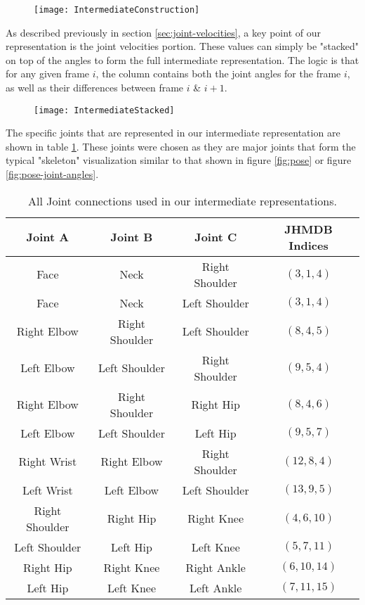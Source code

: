 \begin{figure}[ht]
	\texttt{[image: IntermediateConstruction]}
	\centering
	\caption{}
	\label{fig:intermediate-construction}
\end{figure}

As described previously in section \ref{sec:joint-velocities}, a key point of our representation is the joint velocities portion. These values can simply be "stacked" on top of the angles to form the full intermediate representation. The logic is that for any given frame $i$, the column contains both the joint angles for the frame $i$, as well as their differences between frame $i$ \& $i+1$.

\begin{figure}[ht]
	\texttt{[image: IntermediateStacked]}
	\centering
	\caption{}
	\label{fig:intermediate-stacked}
\end{figure}

The specific joints that are represented in our intermediate representation are shown in table \ref{tab:joint-connections}. These joints were chosen as they are major joints that form the typical "skeleton" visualization similar to that shown in figure \ref{fig:pose} or figure \ref{fig:pose-joint-angles}.

\begin{table}[ht]
	\centering
	\begin{tabular}{||c c c c||} 
		\hline
		\textbf{Joint A} & \textbf{Joint B} & \textbf{Joint C} & \textbf{JHMDB Indices} \\ [0.5ex] 
		\hline\hline
		Face & Neck & Right Shoulder & $(3, 1, 4)$ \\
		Face & Neck & Left Shoulder & $(3, 1, 4)$ \\
		\hline
		Right Elbow & Right Shoulder & Left Shoulder & $(8, 4, 5)$ \\
		Left Elbow & Left Shoulder & Right Shoulder & $(9, 5, 4)$ \\
		\hline
		Right Elbow & Right Shoulder & Right Hip & $(8, 4, 6)$ \\
		Left Elbow & Left Shoulder & Left Hip & $(9, 5, 7)$ \\
		\hline
		Right Wrist & Right Elbow & Right Shoulder & $(12, 8, 4)$ \\
		Left Wrist & Left Elbow & Left Shoulder & $(13, 9, 5)$ \\
		\hline
		Right Shoulder & Right Hip & Right Knee & $(4, 6, 10)$ \\
		Left Shoulder & Left Hip & Left Knee & $(5, 7, 11)$ \\
		\hline
		Right Hip & Right Knee & Right Ankle & $(6, 10, 14)$ \\
		Left Hip & Left Knee & Left Ankle & $(7, 11, 15)$ \\
		\hline
	\end{tabular}
	\caption{All Joint connections used in our intermediate representations.}
	\label{tab:joint-connections}
\end{table}

